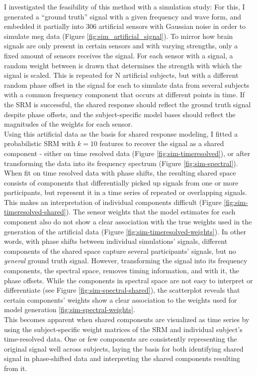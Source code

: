 I investigated the feasibility of this method with a simulation study:
For this, I generated a ``ground truth'' signal with a given frequency and wave form, and embedded it partially into 306 artificial sensors with Gaussian noise in order to simulate \gls{meg} data (Figure \ref{fig:sim_artificial_signal}).
To mirror how brain signals are only present in certain sensors and with varying strengths, only a fixed amount of sensors receives the signal.
For each sensor with a signal, a random weight between is drawn that determines the strength with which the signal is scaled.
This is repeated for N artificial subjects, but with a different random phase offset in the signal for each to simulate data from several subjects with a common frequency component that occurs at different points in time.
If the \gls{SRM} is successful, the shared response should reflect the ground truth signal despite phase offsets, and the subject-specific model bases should reflect the magnitudes of the weights for each sensor.\\
Using this artificial data as the basis for shared response modeling, I fitted a probabilistic \gls{SRM} with $k=10$ features to recover the signal as a shared component - either on time resolved data (Figure \ref{fig:sim-timeresolved}), or after transforming the data into its frequency spectrum (Figure \ref{fig:sim-spectral}).\\
When fit on time resolved data with phase shifts, the resulting shared space consists of components that differentially picked up signals from one or more participants, but represent it in a time series of repeated or overlapping signals.
This makes an interpretation of individual components difficult (Figure \ref{fig:sim-timeresolved-shared}).
The sensor weights that the model estimates for each component also do not show a clear association with the true weights used in the generation of the artificial data (Figure \ref{fig:sim-timeresolved-weights}).
In other words, with phase shifts between individual simulations' signals, different components of the shared space capture several participants' signals, but no \textit{general} ground truth signal.
However, transforming the signal into its frequency components, the spectral space, removes timing information, and with it, the phase offsets.
While the components in spectral space are not easy to interpret or differentiate (see Figure \ref{fig:sim-spectral-shared}), the scatterplot reveals that certain components' weights show a clear association to the weights used for model generation \ref{fig:sim-spectral-weights}.\\
This becomes apparent when shared components are visualized as time series by using the subject-specific weight matrices of the \gls{SRM} and individual subject's time-resolved data.
One or few components are consistently representing the original signal well across subjects, laying the basis for both identifying shared signal in phase-shifted data and interpreting the shared components resulting from it.


